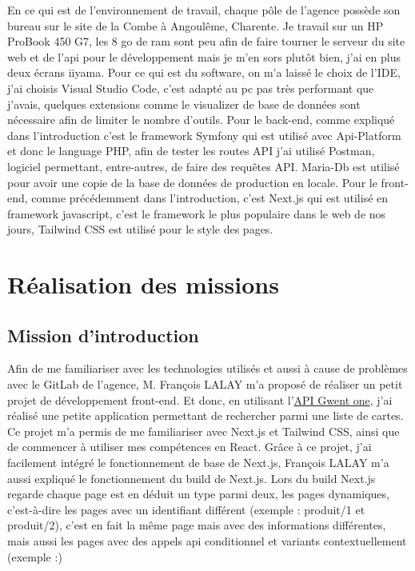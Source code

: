 \documentclass[a4paper,12pt]{report}
\begin{document}
En ce qui est de l'environnement de travail, chaque pôle de l'agence possède son bureau sur le site de la Combe à Angoulême, Charente. Je travail sur un HP ProBook 450 G7, les 8 go de ram sont peu afin de faire tourner le serveur du site web et de l'api pour le développement mais je m'en sors plutôt bien, j'ai en plus deux écrans iiyama. Pour ce qui est du software, on m'a laissé le choix de l'IDE, j'ai choisis Visual Studio Code, c'est adapté au pc pas très performant que j'avais, quelques extensions comme le visualizer de base de données sont nécessaire afin de limiter le nombre d'outils. Pour le back-end, comme expliqué dans l'introduction c'est le framework Symfony qui est utilisé avec Api-Platform et donc le language PHP, afin de tester les routes API j'ai utilisé Postman, logiciel permettant, entre-autres, de faire des requêtes API. Maria-Db est utilisé pour avoir une copie de la base de données de production en locale. Pour le front-end, comme précédemment dans l'introduction, c'est Next.js qui est utilisé en framework javascript, c'est le framework le plus populaire dans le web de nos jours, Tailwind CSS est utilisé pour le style des pages.

\chapter{Réalisation des missions}
\section{Mission d'introduction}

Afin de me familiariser avec les technologies utilisés et aussi à cause de problèmes avec le GitLab de l'agence, M. François LALAY m'a proposé de réaliser un petit projet de développement front-end. Et donc, en utilisant l'\href{https://api.gwent.one/}{API Gwent one}, j'ai réalisé une petite application permettant de rechercher parmi une liste de cartes. Ce projet m'a permis de me familiariser avec Next.js et Tailwind CSS, ainsi que de commencer à utiliser mes compétences en React. Grâce à ce projet, j'ai facilement intégré le fonctionnement de base de Next.js, François LALAY m'a aussi expliqué le fonctionnement du build de Next.js. Lors du build Next.js regarde chaque page est en déduit un type parmi deux, les pages dynamiques, c'est-à-dire les pages avec un identifiant différent (exemple : produit/1 et produit/2), c'est en fait la même page mais avec des informations différentes, mais aussi les pages avec des appels api conditionnel et variants contextuellement (exemple :)
\end{document}
